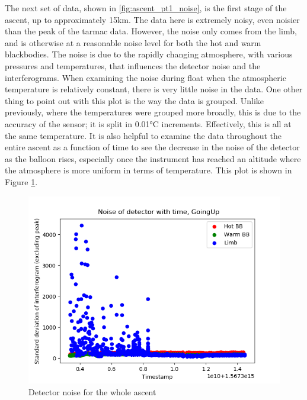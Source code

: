 The next set of data, shown in \ref{fig:ascent_pt1_noise}, is the first stage of the ascent, up to approximately 15km. The data here is extremely noisy, even noisier than the peak of the tarmac data. However, the noise only comes from the limb, and is otherwise at a reasonable noise level for both the hot and warm blackbodies. The noise is due to the rapidly changing atmosphere, with various pressures and temperatures, that influences the detector noise and the interferograms. When examining the noise during float when the atmospheric temperature is relatively constant, there is very little noise in the data. One other thing to point out with this plot is the way the data is grouped. Unlike previously, where the temperatures were grouped more broadly, this is due to the accuracy of the sensor; it is split in 0.01°C increments. Effectively, this is all at the same temperature. It is also helpful to examine the data throughout the entire ascent as a function of time to see the decrease in the noise of the detector as the balloon rises, especially once the instrument has reached an altitude where the atmosphere is more uniform in terms of temperature. This plot is shown in Figure \ref{fig:ascent_noisetime}.

\begin{figure}
\centering
  \includegraphics[width=0.8\linewidth]{mct_noise_temp_plots/goingup_allparts_noisevtime_colour.png}
  \caption{Detector noise for the whole ascent}
  \label{fig:ascent_noisetime}
\end{figure}

